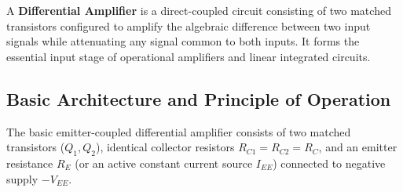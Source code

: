 \documentclass[12pt,a4paper]{article}
\begin{document}
\begin{tcolorbox}[defbox, title={Definition: Differential Amplifier}]
A \textbf{Differential Amplifier} is a direct-coupled circuit consisting of two matched transistors configured to amplify the algebraic difference between two input signals while attenuating any signal common to both inputs. It forms the essential input stage of operational amplifiers and linear integrated circuits.
\end{tcolorbox}

\subsection{Basic Architecture and Principle of Operation}
The basic emitter-coupled differential amplifier consists of two matched transistors ($Q_1, Q_2$), identical collector resistors $R_{C1} = R_{C2} = R_C$, and an emitter resistance $R_E$ (or an active constant current source $I_{EE}$) connected to negative supply $-V_{EE}$.
\end{document}
